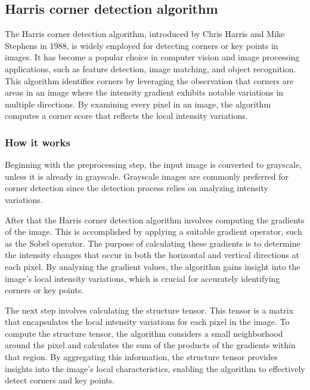 \subsection{Harris corner detection algorithm }
The Harris corner detection algorithm, introduced by Chris Harris and Mike Stephens in 1988, is widely 
employed for detecting corners or key points in images. It has become a popular choice in computer vision and 
image processing applications, such as feature detection, image matching, and object recognition.
This algorithm identifies corners by leveraging the observation that corners are areas in an image where the 
intensity gradient exhibits notable variations in multiple directions. By examining every pixel in an image, the 
algorithm computes a corner score that reflects the local intensity variations. \cite{harristheory2}

\subsubsection{How it works}
Beginning with the preprocessing step, the input image is converted to grayscale, 
unless it is already in grayscale. Grayscale images are commonly preferred for corner detection 
since the detection process relies on analyzing intensity variations.

After that the Harris corner detection algorithm involves computing the gradients of the image. 
This is accomplished by applying a suitable gradient operator, such as the Sobel operator. 
The purpose of calculating these gradients is to determine the intensity changes that occur in 
both the horizontal and vertical directions at each pixel. By analyzing the gradient values, the 
algorithm gains insight into the image's local intensity variations, which is crucial for 
accurately identifying corners or key points.

The next step involves calculating the structure tensor. This tensor is a matrix that encapsulates 
the local intensity variations for each pixel in the image. To compute the structure tensor, the algorithm 
considers a small neighborhood around the pixel and calculates the sum of the products of the gradients within 
that region. By aggregating this information, the structure tensor provides insights into the image's local 
characteristics, enabling the algorithm to effectively detect corners and key points.

